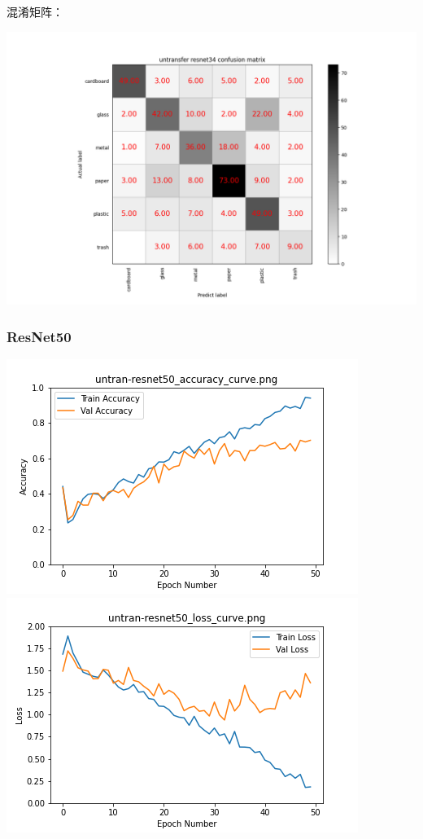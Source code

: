 \documentclass[UTF8]{ctexart}
\begin{document}
混淆矩阵：

\includegraphics[scale=0.5]{cm/unresnet34.png} 

\subsubsection{ResNet50}
 
\includegraphics[scale=0.5]{image/untran-resnet50_accuracy_curve.png} 
\includegraphics[scale=0.5]{image/untran-resnet50_loss_curve.png} 
\end{document}

